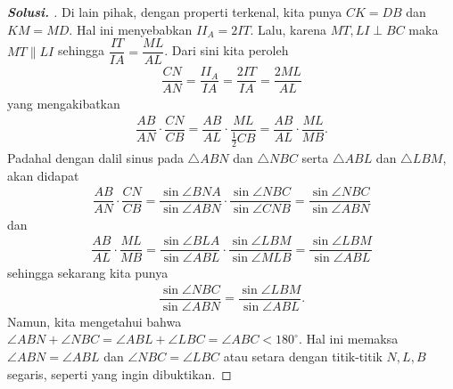 \begin{proof}[\textbf{Solusi. }]
Di lain pihak, dengan properti terkenal, kita punya $CK=DB$ dan $KM=MD$. Hal ini menyebabkan $II_A = 2 IT$. Lalu, karena $MT, LI \perp BC$ maka $MT \parallel LI$ sehingga $\dfrac{IT}{IA}=\dfrac{ML}{AL}$. Dari sini kita peroleh
\begin{align*}
    \dfrac{CN}{AN} = \dfrac{II_A}{IA} = \dfrac{2IT}{IA} = \dfrac{2ML}{AL}
\end{align*}
yang mengakibatkan
\begin{align*}
    \dfrac{AB}{AN} \cdot \dfrac{CN}{CB} = \dfrac{AB}{AL} \cdot \dfrac{ML}{\frac{1}{2}CB} = \dfrac{AB}{AL} \cdot \dfrac{ML}{MB}.
\end{align*}
Padahal dengan dalil sinus pada $\triangle ABN$ dan $\triangle NBC$ serta $\triangle ABL$ dan $\triangle LBM$, akan didapat
\begin{align*}
    \dfrac{AB}{AN}\cdot\dfrac{CN}{CB} = \dfrac{\sin \angle BNA}{\sin \angle ABN} \cdot \dfrac{\sin \angle NBC}{\sin \angle CNB} = \dfrac{\sin \angle NBC}{\sin \angle ABN}
\end{align*}
dan
\begin{align*}
    \dfrac{AB}{AL}\cdot\dfrac{ML}{MB} = \dfrac{\sin \angle BLA}{\sin \angle ABL} \cdot \dfrac{\sin \angle LBM}{\sin \angle MLB} = \dfrac{\sin \angle LBM}{\sin \angle ABL}
\end{align*}
sehingga sekarang kita punya
\begin{align*}
    \dfrac{\sin \angle NBC}{\sin \angle ABN} = \dfrac{\sin \angle LBM}{\sin \angle ABL}.
\end{align*}
Namun, kita mengetahui bahwa $\angle ABN + \angle NBC = \angle ABL + \angle LBC = \angle ABC < 180^\circ$. Hal ini memaksa $\angle ABN = \angle ABL$ dan $\angle NBC = \angle LBC$ atau setara dengan titik-titik $N,L,B$ segaris, seperti yang ingin dibuktikan.
\end{proof}